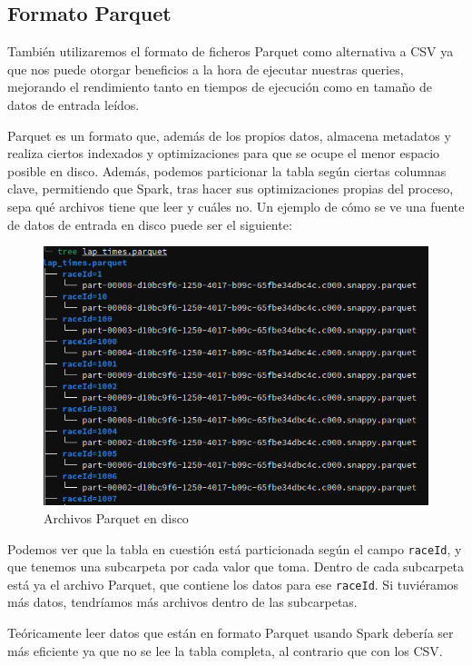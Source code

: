 \documentclass[12pt,twoside,titlepage]{report}
\begin{document}
\subsection{Formato Parquet}

También utilizaremos el formato de ficheros Parquet como alternativa a CSV ya que nos puede otorgar beneficios a la hora de ejecutar nuestras queries, mejorando el rendimiento tanto en tiempos de ejecución como en tamaño de datos de entrada leídos.

Parquet es un formato que, además de los propios datos, almacena metadatos y realiza ciertos indexados y optimizaciones para que se ocupe el menor espacio posible en disco. Además, podemos particionar la tabla según ciertas columnas clave, permitiendo que Spark, tras hacer sus optimizaciones propias del proceso, sepa qué archivos tiene que leer y cuáles no. Un ejemplo de cómo se ve una fuente de datos de entrada en disco puede ser el siguiente:

\begin{figure}[H]
	\includegraphics[scale=0.35]{treeparquet.png}
	\centering
	\caption{Archivos Parquet en disco}
	\label{fig:parquetendisco}
	\centering
\end{figure}

Podemos ver que la tabla en cuestión está particionada según el campo \texttt{raceId}, y que tenemos una subcarpeta por cada valor que toma. Dentro de cada subcarpeta está ya el archivo Parquet, que contiene los datos para ese \texttt{raceId}. Si tuviéramos más datos, tendríamos más archivos dentro de las subcarpetas.

Teóricamente leer datos que están en formato Parquet usando Spark debería ser más eficiente ya que no se lee la tabla completa, al contrario que con los CSV.
\end{document}
